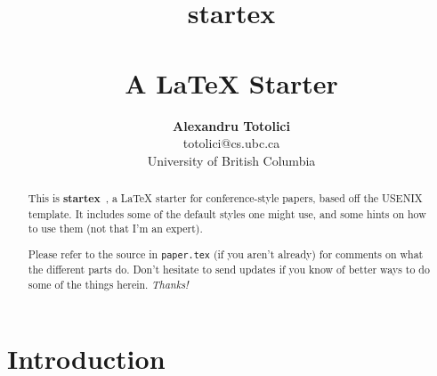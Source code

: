 \documentclass[letterpaper,twocolumn,10pt,final]{article}
\begin{document}
\date{}

\title{\selectfont
    {\huge{\textbf{startex}}}\\
    {\large{\textbf{\\A LaTeX Starter}}}}


\author{
{\rm \textbf{Alexandru Totolici}}\\
{\rm totolici@cs.ubc.ca}\\
University of British Columbia\\
} %

\maketitle

\thispagestyle{empty}

\begin{abstract}
This is \textbf{startex}~\cite{startex}, a LaTeX starter for conference-style papers, based off the USENIX template. It includes some of the default styles one might use, and some hints on how to use them (not that I'm an expert).

Please refer to the source in \texttt{paper.tex} (if you aren't already) for comments on what the different parts do. Don't hesitate to send updates if you know of better ways to do some of the things herein. \textit{Thanks!}
\end{abstract}

\section{\label{sec:intro}Introduction}

\end{document}
